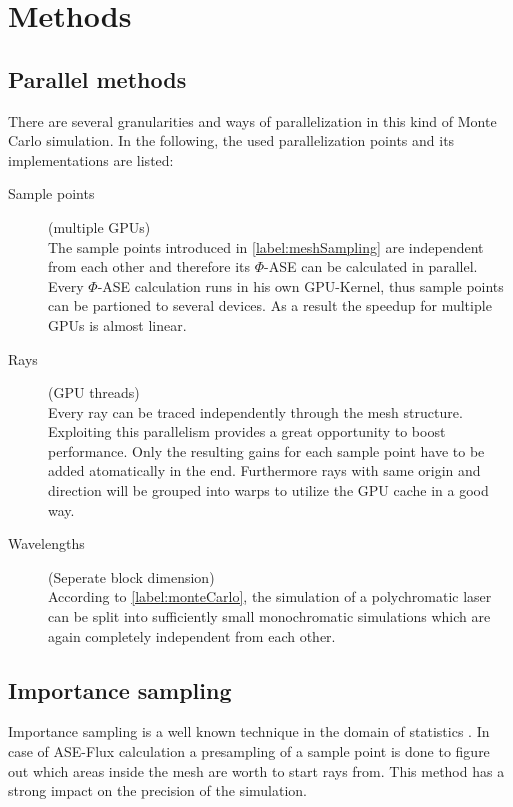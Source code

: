 \section{Methods}
\subsection{Parallel methods}
There are several granularities and ways of parallelization in this kind of 
Monte Carlo simulation. In the following, the used parallelization points and
its implementations are listed:

\begin{description}

  \item[Sample points] (multiple GPUs)\\
    The sample points introduced in \ref{label:meshSampling} are independent from each other
    and therefore its $\Phi$-ASE can be calculated in parallel. Every $\Phi$-ASE
    calculation runs in his own GPU-Kernel, thus sample points can be partioned 
    to several devices. As a result the speedup for multiple GPUs is almost linear.

  \item[Rays] (GPU threads)\\
    Every ray can be traced independently through the mesh structure.
    Exploiting this parallelism provides a great opportunity to boost
    performance. Only the resulting gains for each sample point have to be
    added atomatically in the end.
    Furthermore rays with same origin and direction will be grouped
    into warps to utilize the GPU cache in a good way.

  \item[Wavelengths] (Seperate block dimension)\\
    According to \ref{label:monteCarlo}, the simulation of a polychromatic
    laser can be split into sufficiently small monochromatic simulations which
    are again completely independent from each other.

\end{description}

\subsection{Importance sampling}
Importance sampling is a well known technique in the domain
of statistics \cite{importanceSamplingSource}. In case of 
ASE-Flux calculation a presampling of a sample point is done
to figure out which areas inside the mesh are worth to start rays from.
This method has a strong impact on the precision of the
simulation.


